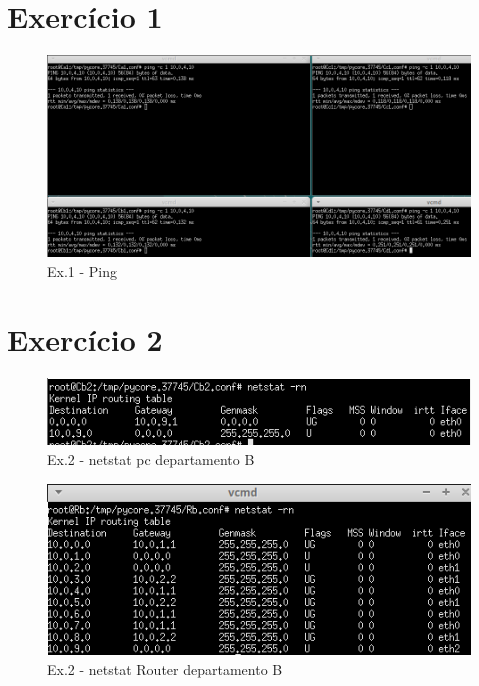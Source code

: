 \documentclass[a4paper]{report}
\begin{document}
\section{Exercício 1}

\begin{figure}[H]
    \centering 
    \includegraphics[width=\textwidth]{images/pingEx1P2.png}
    \caption{Ex.1 - Ping}
    \label{fig:pingEx1P2}
\end{figure}

\pagebreak
\section{Exercício 2}

\begin{figure}[H]
    \centering 
    \includegraphics[width=\textwidth]{images/netstatPcEx2P2.png}
    \caption{Ex.2 - netstat pc departamento B}
    \label{fig:netstatPcEx2P2}
\end{figure}

\begin{figure}[H]
    \centering 
    \includegraphics[width=\textwidth]{images/netstatRouterEx2P2.png}
    \caption{Ex.2 - netstat Router departamento B}
    \label{fig:netstatRouterEx2P2}
\end{figure}
\end{document}
